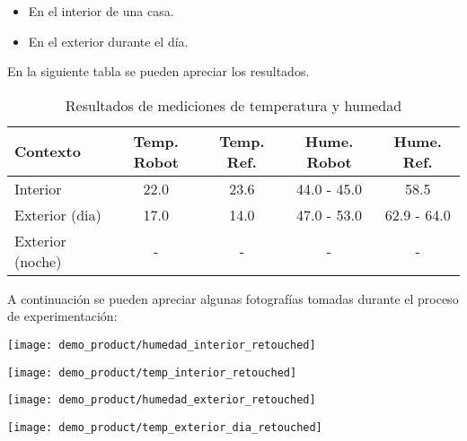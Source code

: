 \begin{itemize}
	\item En el interior de una casa.
	\item En el exterior durante el día.
\end{itemize}

En la siguiente tabla se pueden apreciar los resultados.

\begin{table}[h]
\centering
\caption[Resultados de mediciones de temperatura y humedad]{Resultados de mediciones de temperatura y humedad}
\begin{tabular}{l c c c c}
\toprule
\textbf{Contexto} & \textbf{Temp. Robot} & \textbf{Temp. Ref.} & \textbf{Hume. Robot}  & \textbf{Hume. Ref.}\\
\midrule
Interior & 22.0 & 23.6 & 44.0 - 45.0 & 58.5 \\
Exterior (dia) & 17.0  & 14.0 & 47.0 - 53.0 & 62.9 - 64.0 \\
Exterior (noche) & - & - & - & - \\
\bottomrule
\hline
\end{tabular}
\end{table}

A continuación se pueden apreciar algunas fotografías tomadas durante el proceso de experimentación:

\begin{center}
\texttt{[image: demo\_product/humedad\_interior\_retouched]}
  \label{fig:humedad_interior}
\end{center}

\begin{center}
\texttt{[image: demo\_product/temp\_interior\_retouched]}
  \label{fig:humedad_interior}
\end{center}


\begin{center}
\texttt{[image: demo\_product/humedad\_exterior\_retouched]}
  \label{fig:humedad_interior}
\end{center}

\begin{center}
\texttt{[image: demo\_product/temp\_exterior\_dia\_retouched]}
  \label{fig:humedad_interior}
\end{center}

